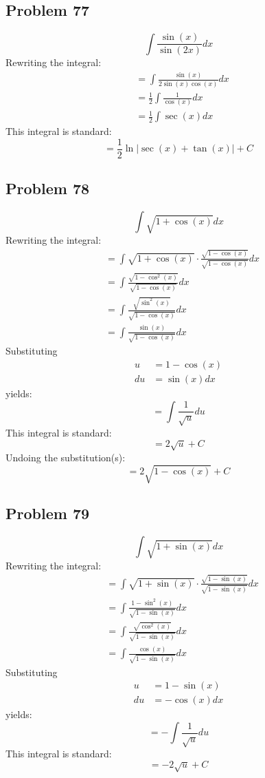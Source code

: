 \documentclass{article}
\begin{document}
\subsection*{Problem 77}
$$\int\frac{\sin\left(x\right)}{\sin\left(2x\right)}dx$$
Rewriting the integral:
\begin{align*}
&=\int\frac{\sin(x)}{2\sin(x)\cos(x)}dx \\
&=\frac{1}{2}\int\frac{1}{\cos(x)}dx \\
&=\frac{1}{2}\int\sec(x)dx
\end{align*}
This integral is standard:
$$=\frac{1}{2}\ln\left|\sec(x)+\tan(x)\right|+C$$
\subsection*{Problem 78}
$$\int\sqrt{1+\cos\left(x\right)}dx$$
Rewriting the integral:
\begin{align*}
&=\int\sqrt{1+\cos(x)}\cdot\frac{\sqrt{1-\cos(x)}}{\sqrt{1-\cos(x)}}dx \\
&=\int\frac{\sqrt{1-\cos^2(x)}}{\sqrt{1-\cos(x)}}dx \\
&=\int\frac{\sqrt{\sin^2(x)}}{\sqrt{1-\cos(x)}}dx \\
&=\int\frac{\sin(x)}{\sqrt{1-\cos(x)}}dx
\end{align*}
Substituting
\begin{align*}
u&=1-\cos(x) \\
du&=\sin(x)dx
\end{align*}
yields:
$$=\int\frac{1}{\sqrt{u}}du$$
This integral is standard:
$$=2\sqrt{u}+C$$
Undoing the substitution(s):
$$=2\sqrt{1-\cos(x)}+C$$
\subsection*{Problem 79}
$$\int\sqrt{1+\sin\left(x\right)}dx$$
Rewriting the integral:
\begin{align*}
&=\int\sqrt{1+\sin(x)}\cdot\frac{\sqrt{1-\sin(x)}}{\sqrt{1-\sin(x)}}dx \\
&=\int\frac{1-\sin^2(x)}{\sqrt{1-\sin(x)}}dx \\
&=\int\frac{\sqrt{\cos^2(x)}}{\sqrt{1-\sin(x)}}dx \\
&=\int\frac{\cos(x)}{\sqrt{1-\sin(x)}}dx
\end{align*}
Substituting
\begin{align*}
u&=1-\sin(x) \\
du&=-\cos(x)dx
\end{align*}
yields:
$$=-\int\frac{1}{\sqrt{u}}du$$
This integral is standard:
$$=-2\sqrt{u}+C$$
\end{document}
